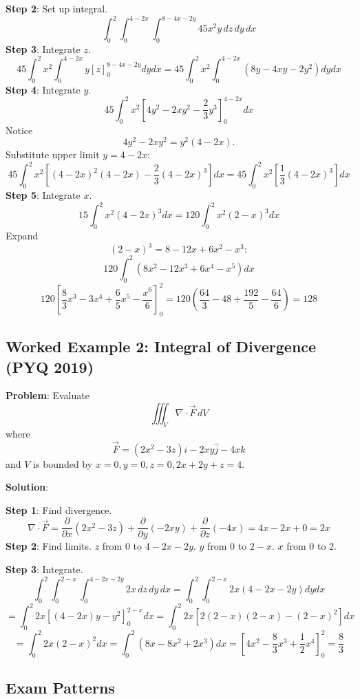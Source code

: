 \documentclass[
]{article}
\begin{document}
\textbf{Step 2}: Set up integral.
\[
\int_0^2 \int_0^{4-2x} \int_0^{8-4x-2y} 45x^2y \, dz \, dy \, dx
\]
\textbf{Step 3}: Integrate \(z\).
\[
45 \int_0^2 x^2 \int_0^{4-2x} y [z]_0^{8-4x-2y} dy dx = 45 \int_0^2 x^2 \int_0^{4-2x} (8y - 4xy - 2y^2) dy dx
\]
\textbf{Step 4}: Integrate \(y\).
\[
45 \int_0^2 x^2 \left[ 4y^2 - 2xy^2 - \frac{2}{3}y^3 \right]_0^{4-2x} dx
\]
Notice
\[
4y^2 - 2xy^2 = y^2(4 - 2x).
\]
Substitute upper limit \(y = 4-2x\):
\[
45 \int_0^2 x^2 \left[ (4-2x)^2(4-2x) - \frac{2}{3}(4-2x)^3 \right] dx = 45 \int_0^2 x^2 \left[ \frac{1}{3}(4-2x)^3 \right] dx
\]
\textbf{Step 5}: Integrate \(x\).
\[
15 \int_0^2 x^2 (4-2x)^3 dx = 120 \int_0^2 x^2 (2-x)^3 dx
\]
Expand
\[
(2-x)^3 = 8 - 12x + 6x^2 - x^3:
\]
\[
120 \int_0^2 (8x^2 - 12x^3 + 6x^4 - x^5) dx
\]
\[
120 \left[ \frac{8}{3}x^3 - 3x^4 + \frac{6}{5}x^5 - \frac{x^6}{6} \right]_0^2 = 120 \left( \frac{64}{3} - 48 + \frac{192}{5} - \frac{64}{6} \right) = 128
\]

\subsection{Worked Example 2: Integral of Divergence (PYQ
2019)}\label{worked-example-2-integral-of-divergence-pyq-2019}

\textbf{Problem}: Evaluate
\[
\iiint_V \nabla \cdot \vec{F} \, dV
\]
where
\[
\vec{F} = (2x^2 - 3z)\hat{i} - 2xy\hat{j} - 4x\hat{k}
\]
and \(V\) is bounded by \(x=0, y=0, z=0, 2x+2y+z=4\).

\textbf{Solution}:

\textbf{Step 1}: Find divergence.
\[
\nabla \cdot \vec{F} = \frac{\partial}{\partial x}(2x^2 - 3z) + \frac{\partial}{\partial y}(-2xy) + \frac{\partial}{\partial z}(-4x) = 4x - 2x + 0 = 2x
\]
\textbf{Step 2}: Find limits. \(z\) from \(0\) to \(4 - 2x - 2y\). \(y\)
from \(0\) to \(2 - x\). \(x\) from \(0\) to \(2\).

\textbf{Step 3}: Integrate.
\[
\int_0^2 \int_0^{2-x} \int_0^{4-2x-2y} 2x \, dz \, dy \, dx = \int_0^2 \int_0^{2-x} 2x(4 - 2x - 2y) dy dx
\]
\[
= \int_0^2 2x \left[ (4-2x)y - y^2 \right]_0^{2-x} dx = \int_0^2 2x \left[ 2(2-x)(2-x) - (2-x)^2 \right] dx
\]
\[
= \int_0^2 2x (2-x)^2 dx = \int_0^2 (8x - 8x^2 + 2x^3) dx = \left[ 4x^2 - \frac{8}{3}x^3 + \frac{1}{2}x^4 \right]_0^2 = \frac{8}{3}
\]

\subsection{Exam Patterns}\label{exam-patterns-13}
\end{document}
